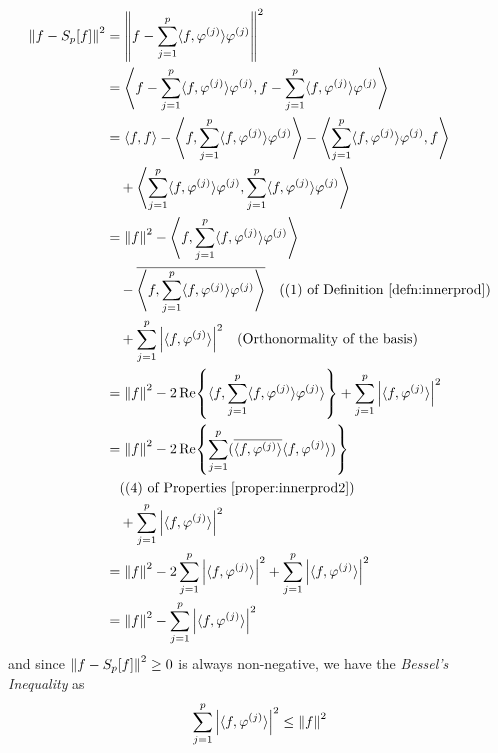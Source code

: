 \begin{align} 
\norm{f - S_p[f]}^2 &= \norm{f - \sum_{j=1}^{p} \langle f, \varphi^{(j)} \rangle \varphi^{(j)}}^2 \nonumber \\
&= \left\langle f - \sum_{j=1}^{p} \langle f, \varphi^{(j)} \rangle \varphi^{(j)}, f - \sum_{j=1}^{p} \langle f, \varphi^{(j)} \rangle \varphi^{(j)} \right\rangle \nonumber \\
&= \langle f, f \rangle - \left\langle f, \sum_{j=1}^{p} \langle f, \varphi^{(j)} \rangle \varphi^{(j)} \right\rangle - \left\langle \sum_{j=1}^{p} \langle f, \varphi^{(j)} \rangle \varphi^{(j)}, f \right\rangle \nonumber \\
&\quad + \left\langle \sum_{j=1}^{p} \langle f, \varphi^{(j)} \rangle \varphi^{(j)}, \sum_{j=1}^{p} \langle f, \varphi^{(j)} \rangle \varphi^{(j)} \right\rangle \nonumber \\
&= \norm{f}^2 - \left\langle f, \sum_{j=1}^{p} \langle f, \varphi^{(j)} \rangle \varphi^{(j)} \right\rangle \nonumber \\
&\quad - \overline{\left\langle f, \sum_{j=1}^{p} \langle f, \varphi^{(j)} \rangle \varphi^{(j)} \right\rangle} \quad \text{((1) of Definition \ref{defn:innerprod})} \nonumber \\
&\quad + \sum_{j=1}^{p} \abs{\langle f, \varphi^{(j)} \rangle}^2 \quad \text{(Orthonormality of the basis)} \nonumber \\
&= \norm{f}^2 - 2\Re{\langle f, \sum_{j=1}^{p} \langle f, \varphi^{(j)} \rangle \varphi^{(j)} \rangle} + \sum_{j=1}^{p} \abs{\langle f, \varphi^{(j)} \rangle}^2 \nonumber \\
&= \norm{f}^2 - 2\Re{\sum_{j=1}^{p} (\overline{\langle f, \varphi^{(j)} \rangle} \langle f, \varphi^{(j)} \rangle)} \nonumber \\
& \quad \text{((4) of Properties \ref{proper:innerprod2})}\nonumber \\
&\quad + \sum_{j=1}^{p} \abs{\langle f, \varphi^{(j)} \rangle}^2 \nonumber \\
&= \norm{f}^2 - 2\sum_{j=1}^{p} \abs{\langle f, \varphi^{(j)} \rangle}^2 + \sum_{j=1}^{p} \abs{\langle f, \varphi^{(j)} \rangle}^2 \nonumber \\
&= \norm{f}^2 - \sum_{j=1}^{p} \abs{\langle f, \varphi^{(j)} \rangle}^2
\end{align}
and since $\norm{f - S_p[f]}^2 \geq 0$ is always non-negative, we have the \textit{Bessel's Inequality} as
\begin{align}
\sum_{j=1}^{p} \abs{\langle f, \varphi^{(j)} \rangle}^2 \leq \norm{f}^2  \label{eqn:Bessel}
\end{align}
